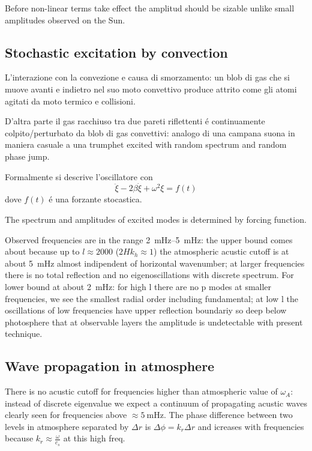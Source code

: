 \documentclass[oneside,12pt,fleqn]{memoir}
\begin{document}
Before non-linear terms take effect the amplitud should be sizable unlike small amplitudes observed on the Sun.

\subsection{Stochastic excitation by convection}

L'interazione con la convezione e causa di smorzamento: un blob di gas che si muove avanti e indietro nel suo moto convettivo produce attrito come gli atomi agitati da moto termico e collisioni.

D'altra parte il gas racchiuso tra due pareti riflettenti \'e continuamente colpito/perturbato da blob di gas convettivi: analogo di una campana suona in maniera casuale a una trumphet excited with random spectrum and random phase jump.

Formalmente si descrive l'oscillatore con
\begin{equation*}
\ddot{\xi}-2\beta\dot{\xi}+\omega^2\xi=f(t)
\end{equation*}
dove $f(t)$ \'e una forzante stocastica.

The spectrum and amplitudes of excited modes is determined by forcing function.

Observed frequencies are in the range \SIrange{2}{5}{\milli\hertz}: the upper bound comes about because up to $l\approx2000$ ($2Hk_h\approx1$) the atmospheric acustic cutoff is at about \SI{5}{\milli\hertz} almost indipendent of horizontal wavenumber; at larger frequencies there is no total reflection and no eigenoscillations with discrete spectrum. For lower bound at about \SI{2}{\milli\hertz}: for high l there are no p modes at smaller frequencies, we see the smallest radial order including fundamental; at low l the oscillations of low frequencies have upper reflection boundariy so deep below photosphere that at observable layers the amplitude is undetectable with present technique.


\subsection{Wave propagation in atmosphere}

There is no acustic cutoff for frequencies higher than atmospheric value of $\omega_A$: instead of discrete eigenvalue we expect a continuum of propagating acustic waves clearly seen for frequencies above $\approx\SI{5}{\milli\hertz}$. The phase difference between two levels in atmosphere separated by $\Delta r$ is $\Delta\phi=k_r\Delta r$ and icreases with frequencies because $k_r\approx\frac{\omega}{c_s}$ at this high freq.
\end{document}
